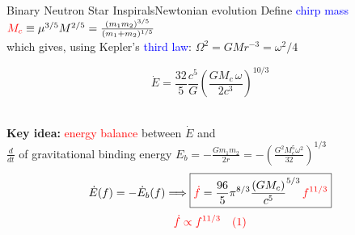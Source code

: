 \documentclass[xcolor=dvipsnames,handout,t]{beamer}
\newcommand{\red}[1]{\textcolor{red}{#1}}
\newcommand{\bl}[1]{\textcolor{blue}{#1}}
\newcommand{\f}{\frac}
\begin{document}
\begin{frame}{Binary Neutron Star Inspirals}{Newtonian evolution}
 Define \bl{chirp mass} \hspace{1.cm} $\red{M_c} \equiv \mu^{3/5} M^{2/5} = \tfrac{(m_1 m_2)^{3/5}}{(m_1+m_2)^{1/5}}$ \\
 \vspace{1mm}
 which gives, using Kepler's \bl{third law}: $\Omega^2 = G M r^{-3}=\omega^2/4$   
 \begin{footnotesize}
  $$ \boxed{\dot{E} = \f{32}{5}\f{c^5}{G} \left(\f{G M_c\, \omega}{2c^3}\right)^{10/3}}$$
 \end{footnotesize}\\
%
{\bf Key idea:} \red{energy balance} between $\dot{E}$ and \\
$\tfrac{d}{dt}$ of gravitational binding energy
$ E_b= -\tfrac{G m_1 m_2}{2r} = -\left(\tfrac{G^2 M_c^5 \omega^2}{32}\right)^{1/3} $
%
\[ 
 \dot{E}(f) = -\dot{E}_b(f) \Longrightarrow \boxed{\red{\dot{f}} = \f{96}{5}\pi^{8/3} \f{(G M_c)}{c^5}^{5/3}\, \red{f^{11/3}} }
 \]
\[
 \red{ \dot{f} \propto f^{11/3}\quad(1)}
\]


\end{frame}
\end{document}
